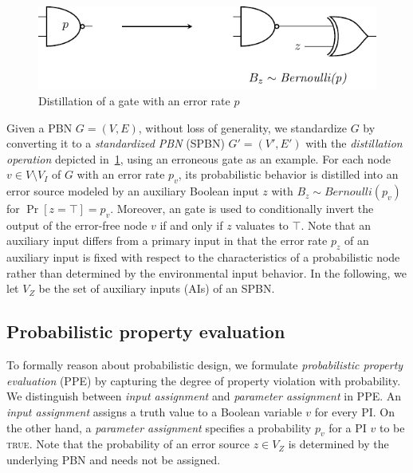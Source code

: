 \begin{figure}[t]
    \centering
    \includegraphics{fig/build/prob-distillation.pdf}
    \caption{Distillation of a \nand gate with an error rate $p$}
    \label{fig:prob-distillation}
\end{figure}

Given a PBN $G=(V,E)$,
without loss of generality,
we standardize $G$ by converting it to a \textit{standardized PBN} (SPBN) $G'=(V',E')$
with the \textit{distillation operation} depicted in~\cref{fig:prob-distillation},
using an erroneous \nand gate as an example.
For each node $v \in V\setminus V_I$ of $G$ with an error rate $p_v$,
its probabilistic behavior is distilled into an error source modeled by an auxiliary Boolean input $z$
with $B_z\sim\textit{Bernoulli}(p_v)$ for $\Pr[z=\top]=p_v$.
Moreover, an \xor gate is used to conditionally invert the output of the error-free node $v$
if and only if $z$ valuates to $\top$.
Note that an auxiliary input differs from a primary input in that
the error rate $p_z$ of an auxiliary input is fixed with respect to the characteristics of a probabilistic node
rather than determined by the environmental input behavior.
In the following, we let $V_Z$ be the set of auxiliary inputs (AIs) of an SPBN.

\subsection{Probabilistic property evaluation}
To formally reason about probabilistic design,
we formulate \textit{probabilistic property evaluation} (PPE) by capturing the degree of property violation with probability.
We distinguish between \textit{input assignment} and \textit{parameter assignment} in PPE.
An \textit{input assignment} assigns a truth value to a Boolean variable $v$ for every PI.
On the other hand,
a \textit{parameter assignment} specifies a probability $p_v$ for a PI $v$ to be \textsc{true}.
Note that the probability of an error source $z \in V_Z$ is determined by the underlying PBN and needs not be assigned.

